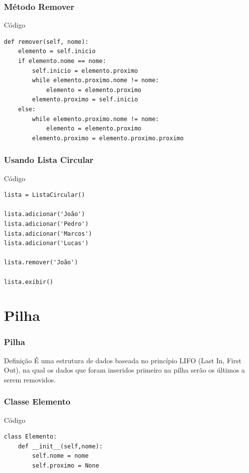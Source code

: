 \documentclass{beamer}
\begin{document}
\begin{frame}[fragile]
\frametitle{Método Remover}

\begin{exampleblock}{Código}

\begin{lstlisting}
def remover(self, nome): 
    elemento = self.inicio
    if elemento.nome == nome:
        self.inicio = elemento.proximo
        while elemento.proximo.nome != nome:
            elemento = elemento.proximo
        elemento.proximo = self.inicio
    else:
        while elemento.proximo.nome != nome:
            elemento = elemento.proximo
        elemento.proximo = elemento.proximo.proximo
\end{lstlisting}
\end{exampleblock}
\end{frame}

\begin{frame}[fragile]
\frametitle{Usando Lista Circular}

\begin{exampleblock}{Código}

\begin{lstlisting}
lista = ListaCircular()

lista.adicionar('João')
lista.adicionar('Pedro')
lista.adicionar('Marcos')
lista.adicionar('Lucas')

lista.remover('João')

lista.exibir()
\end{lstlisting}
\end{exampleblock}
\end{frame}

\section{Pilha}

\begin{frame}
\frametitle{Pilha}

\begin{block}{Definição}
	É uma estrutura de dados baseada no princípio LIFO (Last In, First Out), na qual os dados que foram inseridos primeiro na pilha serão os últimos a serem removidos.
\end{block}
\end{frame}

\begin{frame}[fragile]
\frametitle{Classe Elemento}

\begin{exampleblock}{Código}
	\begin{lstlisting}
class Elemento:
    def __init__(self,nome):
        self.nome = nome
        self.proximo = None
	\end{lstlisting}
\end{exampleblock}
\end{frame}
\end{document}
